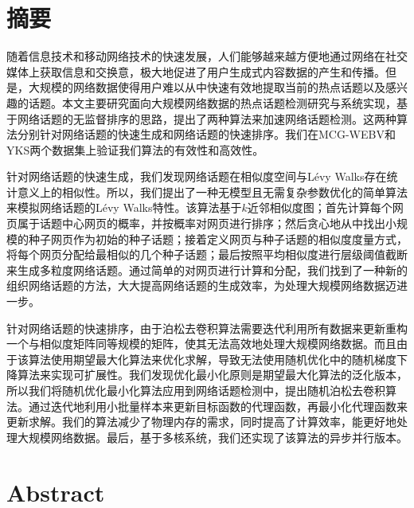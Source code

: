 \maketitle%
\MAKETITLE%
\makedeclaration%
\intobmk\chapter*{摘\quad 要}%
\setcounter{page}{1}%

随着信息技术和移动网络技术的快速发展，人们能够越来越方便地通过网络在社交媒体上获取信息和交换意，极大地促进了用户生成式内容数据的产生和传播。但是，大规模的网络数据使得用户难以从中快速有效地提取当前的热点话题以及感兴趣的话题。本文主要研究面向大规模网络数据的热点话题检测研究与系统实现，基于网络话题的无监督排序的思路，提出了两种算法来加速网络话题检测。这两种算法分别针对网络话题的快速生成和网络话题的快速排序。我们在MCG-WEBV和YKS两个数据集上验证我们算法的有效性和高效性。

针对网络话题的快速生成，我们发现网络话题在相似度空间与L\'evy Walks存在统计意义上的相似性。所以，我们提出了一种无模型且无需复杂参数优化的简单算法来模拟网络话题的L\'evy Walks特性。该算法基于$k$近邻相似度图；首先计算每个网页属于话题中心网页的概率，并按概率对网页进行排序；然后贪心地从中找出小规模的种子网页作为初始的种子话题；接着定义网页与种子话题的相似度度量方式，将每个网页分配给最相似的几个种子话题；最后按照平均相似度进行层级阈值截断来生成多粒度网络话题。通过简单的对网页进行计算和分配，我们找到了一种新的组织网络话题的方法，大大提高网络话题的生成效率，为处理大规模网络数据迈进一步。

针对网络话题的快速排序，由于泊松去卷积算法需要迭代利用所有数据来更新重构一个与相似度矩阵同等规模的矩阵，使其无法高效地处理大规模网络数据。而且由于该算法使用期望最大化算法来优化求解，导致无法使用随机优化中的随机梯度下降算法来实现可扩展性。我们发现优化最小化原则是期望最大化算法的泛化版本，所以我们将随机优化最小化算法应用到网络话题检测中，提出随机泊松去卷积算法。通过迭代地利用小批量样本来更新目标函数的代理函数，再最小化代理函数来更新求解。我们的算法减少了物理内存的需求，同时提高了计算效率，能更好地处理大规模网络数据。最后，基于多核系统，我们还实现了该算法的异步并行版本。


\intobmk\chapter*{Abstract}%

